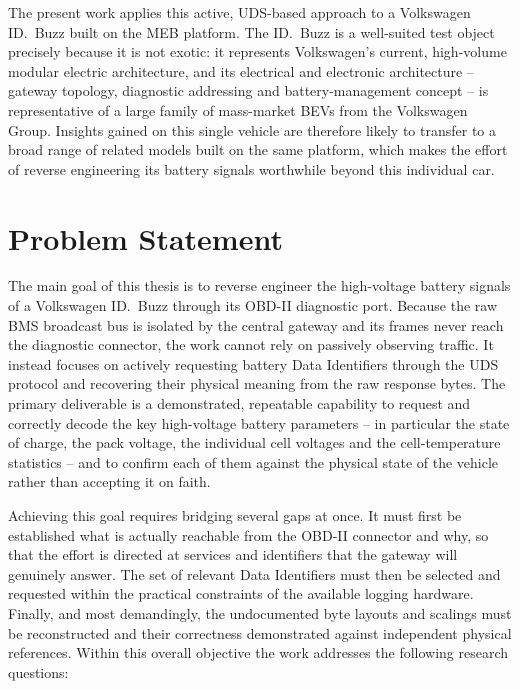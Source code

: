 \documentclass[11pt,a4paper,oneside,parskip=half]{scrreprt}
\begin{document}
The present work applies this active, UDS-based approach to a Volkswagen ID.~Buzz built on the MEB platform. The ID.~Buzz is a well-suited test object precisely because it is not exotic: it represents Volkswagen's current, high-volume modular electric architecture, and its electrical and electronic architecture -- gateway topology, diagnostic addressing and battery-management concept -- is representative of a large family of mass-market BEVs from the Volkswagen Group. Insights gained on this single vehicle are therefore likely to transfer to a broad range of related models built on the same platform, which makes the effort of reverse engineering its battery signals worthwhile beyond this individual car.

\section{Problem Statement}
The main goal of this thesis is to reverse engineer the high-voltage battery signals of a Volkswagen ID.~Buzz through its OBD-II diagnostic port. Because the raw BMS broadcast bus is isolated by the central gateway and its frames never reach the diagnostic connector, the work cannot rely on passively observing traffic. It instead focuses on actively requesting battery Data Identifiers through the UDS protocol and recovering their physical meaning from the raw response bytes. The primary deliverable is a demonstrated, repeatable capability to request and correctly decode the key high-voltage battery parameters -- in particular the state of charge, the pack voltage, the individual cell voltages and the cell-temperature statistics -- and to confirm each of them against the physical state of the vehicle rather than accepting it on faith.

Achieving this goal requires bridging several gaps at once. It must first be established what is actually reachable from the OBD-II connector and why, so that the effort is directed at services and identifiers that the gateway will genuinely answer. The set of relevant Data Identifiers must then be selected and requested within the practical constraints of the available logging hardware. Finally, and most demandingly, the undocumented byte layouts and scalings must be reconstructed and their correctness demonstrated against independent physical references. Within this overall objective the work addresses the following research questions:
\end{document}
